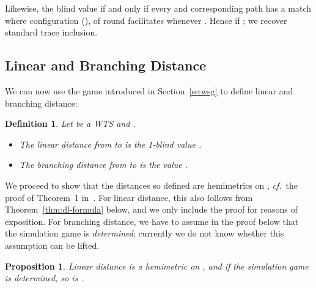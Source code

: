 \documentclass[copyright,creativecommons,sharealike]{eptcs}
\theoremstyle{plain}
\newtheorem{definition}[theorem]{Definition}
\newtheorem{proposition}[theorem]{Proposition}
\newcommand*\cf{\textit{cf.}}
\begin{document}
Likewise, the blind value  if and only if every
 and corresponding path  has a
match  where configuration (),
of round  facilitates  whenever .  Hence  if ; we recover standard trace inclusion.

\subsection{Linear and Branching Distance}

We can now use the game introduced in Section~\ref{se:wsg} to define
linear and branching distance:

\begin{definition}
  \label{de:branch}
  Let  be a WTS and .
  \begin{itemize}
  \item The \emph{linear distance} from  to  is the 1-blind
    value .
  \item The \emph{branching distance} from  to  is the value
    .
  \end{itemize}
\end{definition}

We proceed to show that the distances so defined are hemimetrics on
, \cf~the proof of Theorem~1 in~\cite{conf/concur/CernyHR10}.
For linear distance, this also follows from
Theorem~\ref{thm:dl-formula} below, and we only include the proof for
reasons of exposition.  For branching distance, we have to assume in
the proof below that the simulation game is \emph{determined};
currently we do not know whether this assumption can be lifted.

\begin{proposition}
  \label{prop:hemi}
  Linear distance  is a hemimetric on , and if the simulation
  game is determined, so is .
\end{proposition}
\end{document}
